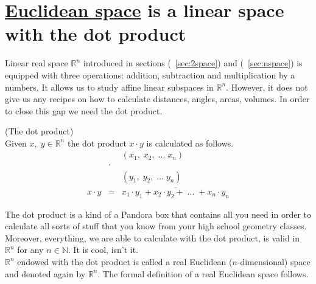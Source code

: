 \documentclass[color=black,11pt]{elegantpaper}
\begin{document}
\section{\href{https://en.wikipedia.org/wiki/Euclidean_space}{Euclidean space} is a linear space with the dot product}
\label{sec:Euclidean_space}
Linear real space $\mathbb{R}^n$ introduced in sections (~\ref{sec:2space}) and (~\ref{sec:nspace}) is equipped with three operations: addition, subtraction and multiplication by a numbers. It allows us to study affine linear subspaces in $\mathbb{R}^n.$ However, it does not give us any recipes on how to calculate distances, angles, areas, volumes. In order to close this gap we need the dot product.
\begin{definition}
(The dot product)\\ 
Given $x,\;y \in \mathbb{R}^n$ the dot product $x\cdot y$ is calculated  as follows.
\begin{eqnarray*}
&& (x_1,\;x_2,\;\dots\;x_n) \\
&\cdot&\\
&& (y_1,\; y_2,\; \dots \; y_n)\\
x\cdot y&=&\overline{x_1\cdot y_1+x_2\cdot y_2+ \; \dots \; +x_n\cdot y_n}
\end{eqnarray*}
\end{definition}
The dot product is a kind of a Pandora box that contains all you need in order to calculate all sorts of stuff that you know from your high school geometry classes. Moreover, everything, we are able to calculate with the dot product, is valid in $\mathbb{R}^n$  for any $n\in \mathbb{N}.$ It is cool, isn't it.\\
$\mathbb{R}^n$ endowed with the dot product is called a real Euclidean ($n$-dimensional) space and denoted again by $\mathbb{R}^n.$ The formal definition of a real Euclidean space follows.
\end{document}

